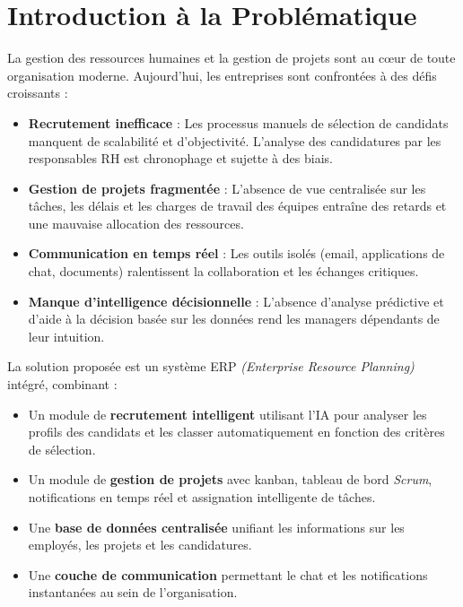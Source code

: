 \introduction

\section{Introduction à la Problématique}

La gestion des ressources humaines et la gestion de projets sont au cœur de toute organisation moderne. Aujourd'hui, les entreprises sont confrontées à des défis croissants :

\begin{itemize}
    \item \textbf{Recrutement inefficace} : Les processus manuels de sélection de candidats manquent de scalabilité et d'objectivité. L'analyse des candidatures par les responsables \gls{RH} est chronophage et sujette à des biais.

    \item \textbf{Gestion de projets fragmentée} : L'absence de vue centralisée sur les tâches, les délais et les charges de travail des équipes entraîne des retards et une mauvaise allocation des ressources.

    \item \textbf{Communication en temps réel} : Les outils isolés (email, applications de chat, documents) ralentissent la collaboration et les échanges critiques.

    \item \textbf{Manque d'intelligence décisionnelle} : L'absence d'analyse prédictive et d'aide à la décision basée sur les données rend les managers dépendants de leur intuition.
\end{itemize}

La solution proposée est un système \gls{ERP} \textit{(Enterprise Resource Planning)} intégré, combinant :

\begin{itemize}
    \item Un module de \textbf{recrutement intelligent} utilisant l'\gls{IA} pour analyser les profils des candidats et les classer automatiquement en fonction des critères de sélection.

    \item Un module de \textbf{gestion de projets} avec kanban, tableau de bord \textit{Scrum}, notifications en temps réel et assignation intelligente de tâches.

    \item Une \textbf{base de données centralisée} unifiant les informations sur les employés, les projets et les candidatures.

    \item Une \textbf{couche de communication} permettant le chat et les notifications instantanées au sein de l'organisation.
\end{itemize}

